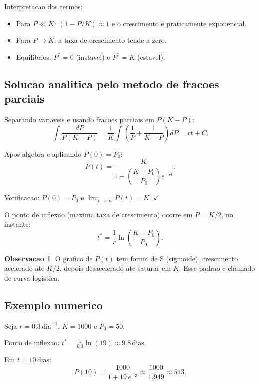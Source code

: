 \documentclass[12pt,a4paper,oneside]{book}
\theoremstyle{definition}
\newtheorem{remark}[definition]{Observacao}
\begin{document}
Interpretacao dos termos:
\begin{itemize}
    \item Para $P \ll K$: $(1 - P/K) \approx 1$ e o crescimento e praticamente exponencial.
    \item Para $P \to K$: a taxa de crescimento tende a zero.
    \item Equilibrios: $P^* = 0$ (instavel) e $P^* = K$ (estavel).
\end{itemize}

\subsection{Solucao analitica pelo metodo de fracoes parciais}

Separando variaveis e usando fracoes parciais em $P(K-P)$:
\begin{equation}
\int \frac{dP}{P(K-P)} = \frac{1}{K}\int\left(\frac{1}{P}+\frac{1}{K-P}\right)dP = rt + C.
\end{equation}

Apos algebra e aplicando $P(0) = P_0$:
\begin{equation}
P(t) = \frac{K}{1 + \left(\dfrac{K - P_0}{P_0}\right)e^{-rt}}.
\end{equation}

Verificacao: $P(0) = P_0$ e $\lim_{t \to \infty} P(t) = K$. $\checkmark$

O ponto de inflexao (maxima taxa de crescimento) ocorre em $P = K/2$, no instante:
\begin{equation}
t^* = \frac{1}{r}\ln\!\left(\frac{K - P_0}{P_0}\right).
\end{equation}

\begin{remark}
O grafico de $P(t)$ tem forma de S (sigmoide): crescimento acelerado ate $K/2$, depois
desacelerado ate saturar em $K$. Esse padrao e chamado de curva logistica.
\end{remark}

\subsection{Exemplo numerico}

Seja $r = 0.3\,\text{dia}^{-1}$, $K = 1000$ e $P_0 = 50$.

Ponto de inflexao: $t^* = \frac{1}{0.3}\ln(19) \approx 9.8\,\text{dias}$.

Em $t = 10\,\text{dias}$:
\begin{equation}
P(10) = \frac{1000}{1 + 19\,e^{-3}} \approx \frac{1000}{1.949} \approx 513.
\end{equation}
\end{document}
